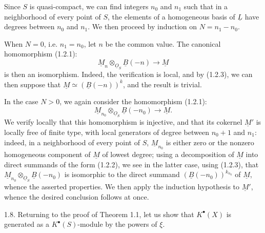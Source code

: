 Since \(S\) is quasi-compact, we can find integers \(n_0\) and \(n_1\) such that in a neighborhood of every point of \(S\), the elements of a homogeneous basis
%
of \(\underline{L}\) have degrees between \(n_0\) and \(n_1\). We then proceed by induction on \(N=n_1-n_0\).

When \(N=0\), i.e. \(n_1=n_0\), let \(n\) be the common value. The canonical homomorphism (1.2.1):
\[
  \underline{M}_n\otimes_{\underline{O}_S}\underline{B}(-n)\longrightarrow \underline{M}
\]
is then an isomorphism. Indeed, the verification is local, and by (1.2.3), we can then suppose that \(\underline{M}\simeq(\underline{B}(-n))^k\), and the result is trivial.

In the case \(N>0\), we again consider the homomorphism (1.2.1):
\[
  \underline{M}_{n_0}\otimes_{\underline{O}_S}\underline{B}(-n_0)\longrightarrow \underline{M}.
\]
We verify locally that this homomorphism is injective, and that its cokernel \(\underline{M}'\) is locally free of finite type, with local generators of degree between \(n_0+1\) and \(n_1\): indeed, in a neighborhood of every point of \(S\), \(\underline{M}_{n_0}\) is either zero or the nonzero homogeneous component of \(\underline{M}\) of lowest degree; using a decomposition of \(\underline{M}\) into direct summands of the form (1.2.2), we see in the latter case, using (1.2.3), that \(\underline{M}_{n_0}\otimes_{\underline{O}_S}\underline{B}(-n_0)\) is isomorphic to the direct summand \((\underline{B}(-n_0))^{k_{n_0}}\) of \(\underline{M}\), whence the asserted properties. We then apply the induction hypothesis to \(\underline{M}'\), whence the desired conclusion follows at once.

1.8. Returning to the proof of Theorem 1.1, let us show that \(K^{\bullet}(X)\) is generated as a \(K^{\bullet}(S)\)-module by the powers of \(\xi\).

